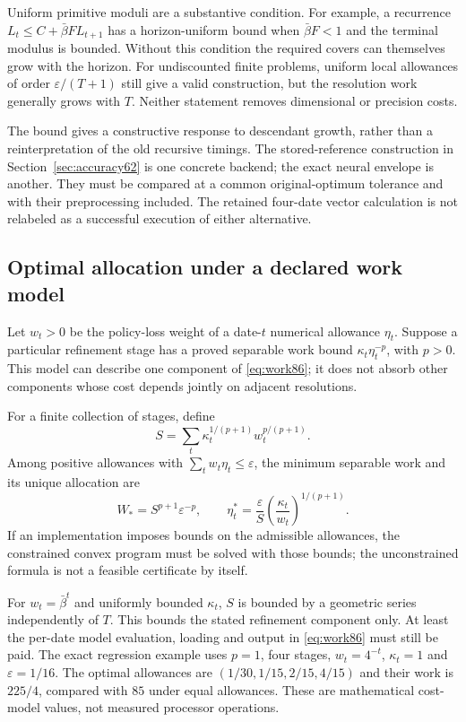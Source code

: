 Uniform primitive moduli are a substantive condition. For example, a recurrence $L_t\le C+\bar\beta F L_{t+1}$ has a horizon-uniform bound when $\bar\beta F<1$ and the terminal modulus is bounded. Without this condition the required covers can themselves grow with the horizon. For undiscounted finite problems, uniform local allowances of order $\varepsilon/(T+1)$ still give a valid construction, but the resolution work generally grows with $T$. Neither statement removes dimensional or precision costs.

The bound gives a constructive response to descendant growth, rather than a reinterpretation of the old recursive timings. The stored-reference construction in Section~\ref{sec:accuracy62} is one concrete backend; the exact neural envelope is another. They must be compared at a common original-optimum tolerance and with their preprocessing included. The retained four-date vector calculation is not relabeled as a successful execution of either alternative.

\subsection{Optimal allocation under a declared work model}
Let $w_t>0$ be the policy-loss weight of a date-$t$ numerical allowance $\eta_t$. Suppose a particular refinement stage has a proved separable work bound $\kappa_t\eta_t^{-p}$, with $p>0$. This model can describe one component of \eqref{eq:work86}; it does not absorb other components whose cost depends jointly on adjacent resolutions.

\begin{theorem}\label{thm:allocation86}
For a finite collection of stages, define
\[
 S=\sum_t\kappa_t^{1/(p+1)}w_t^{p/(p+1)}.
\]
Among positive allowances with $\sum_tw_t\eta_t\le\varepsilon$, the minimum separable work and its unique allocation are
\begin{equation}\label{eq:allocation86}
 W_* = S^{p+1}\varepsilon^{-p},\qquad
 \eta_t^*=\frac{\varepsilon}{S}
                  \left(\frac{\kappa_t}{w_t}\right)^{1/(p+1)}.
\end{equation}
If an implementation imposes bounds on the admissible allowances, the constrained convex program must be solved with those bounds; the unconstrained formula is not a feasible certificate by itself.
\end{theorem}

For $w_t=\bar\beta^t$ and uniformly bounded $\kappa_t$, $S$ is bounded by a geometric series independently of $T$. This bounds the stated refinement component only. At least the per-date model evaluation, loading and output in \eqref{eq:work86} must still be paid. The exact regression example uses $p=1$, four stages, $w_t=4^{-t}$, $\kappa_t=1$ and $\varepsilon=1/16$. The optimal allowances are $(1/30,1/15,2/15,4/15)$ and their work is $225/4$, compared with $85$ under equal allowances. These are mathematical cost-model values, not measured processor operations.


